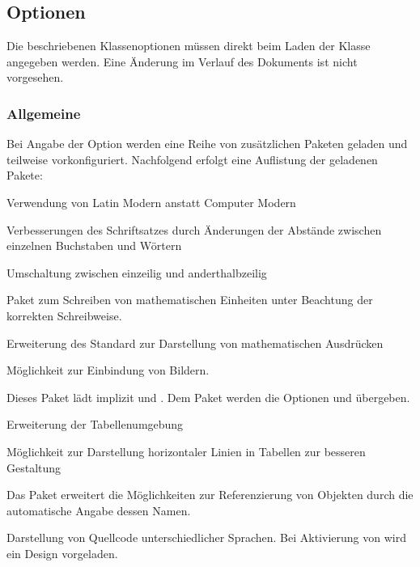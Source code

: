 \documentclass[babel=ngerman,highlight=false]{skdoc}
\begin{document}
        \subsection{Optionen}
            Die beschriebenen Klassenoptionen müssen direkt beim Laden der Klasse angegeben werden. Eine Änderung im Verlauf des Dokuments ist nicht vorgesehen. 
        
            \subsubsection{Allgemeine}
                Bei Angabe der Option  werden eine Reihe von zusätzlichen Paketen geladen und teilweise vorkonfiguriert. Nachfolgend erfolgt eine Auflistung der geladenen Pakete:
                \begin{description}[itemsep=1pt, style=multiline, leftmargin=3cm]
                    \item [\pkg{lmodern}] Verwendung von Latin Modern anstatt Computer Modern
                    \item [\pkg{microtype}] Verbesserungen des Schriftsatzes durch Änderungen der Abstände zwischen einzelnen Buchstaben und Wörtern
                    \item [\pkg{setspace}] Umschaltung zwischen einzeilig und anderthalbzeilig
                    \item [\pkg{siunitx}] Paket zum Schreiben von mathematischen Einheiten unter Beachtung der korrekten Schreibweise.
                    \item [\pkg{mathtools}] Erweiterung des Standard zur Darstellung von mathematischen Ausdrücken
                    \item [\pkg{graphicx}] Möglichkeit zur Einbindung von Bildern.
                    \item [\pkg{tcolobox}] Dieses Paket lädt implizit  und . Dem Paket  werden die Optionen  und  übergeben.
                    \item [\pkg{tabularx}] Erweiterung der Tabellenumgebung
                    \item [\pkg{booktabs}] Möglichkeit zur Darstellung horizontaler Linien in Tabellen zur besseren Gestaltung
                    \item [\pkg{cleveref}] Das Paket erweitert die Möglichkeiten zur Referenzierung von Objekten durch die automatische Angabe dessen Namen.
                    \item [\pkg{listings}] Darstellung von Quellcode unterschiedlicher Sprachen. Bei Aktivierung von  wird ein Design vorgeladen.
                \end{description}
            
\end{document}
